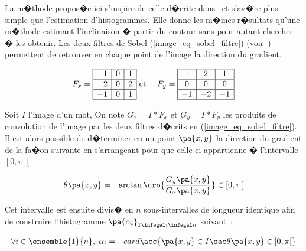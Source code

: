 La m�thode propos�e ici s'inspire de celle d�crite dans~ et s'av�re plus simple que l'estimation d'histogrammes. Elle donne les m�mes r�sultats qu'une m�thode estimant l'inclinaison � partir du contour sans pour autant chercher � les obtenir. Les deux filtres de Sobel (\ref{image_eq_sobel_filtre}) (voir~) permettent de retrouver en chaque point de l'image la direction du gradient. 


            \begin{eqnarray}
            F_x = 
            \begin{array}{|c|c|c|} \hline
            -1 & 0 & 1 \\ \hline
            -2 & 0 & 2 \\ \hline
            -1 & 0 & 1 \\ \hline
            \end{array}
            &
            \text{ et }
            &
            F_y =
            \begin{array}{|c|c|c|} \hline
             1 & 2 & 1 \\ \hline
             0 & 0 & 0 \\ \hline
            -1 & -2 & -1 \\ \hline
            \end{array}
            \label{image_eq_sobel_filtre}
            \end{eqnarray}


Soit $I$ l'image d'un mot, On note $G_x = I * F_x$ et $G_y = I * F_y$ les produits de convolution de l'image par les deux filtres d�crits en (\ref{image_eq_sobel_filtre}). Il est alors possible de d�terminer en un point $\pa{x,y}$ la direction du gradient de la fa�on suivante en s'arrangeant pour que celle-ci appartienne � l'intervalle $\left[0,\pi \right[$~:

            \begin{eqnarray}
            \theta\pa{x,y} &=& \arctan\cro{\dfrac{G_y\pa{x,y}}{G_x\pa{x,y}}} 
            \in \left[0,\pi \right[
            \end{eqnarray}


Cet intervalle est ensuite divis� en $n$ sous-intervalles de longueur identique afin de construire l'histogramme $\pa{\alpha_i}_{1 \infegal i \infegal n}$ suivant~:


        \begin{eqnarray}
        \forall i \in \ensemble{1}{n}, \; \alpha_i &=&  card 
        \acc{ \pa{x,y} \in I \sac \theta\pa{x,y} \in \left[0,\pi \right[ } \nonumber
        \end{eqnarray}


